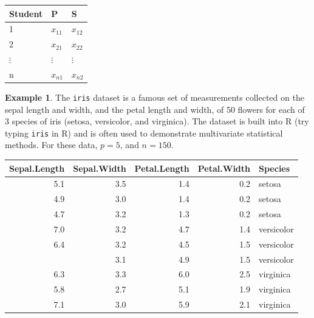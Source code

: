 \documentclass[
]{book}
\theoremstyle{definition}
\theoremstyle{definition}
\newtheorem{example}{Example}[chapter]
\theoremstyle{definition}
\theoremstyle{definition}
\theoremstyle{remark}
\begin{document}
\begin{table}
\centering
\begin{tabular}{lll}
\toprule
Student & P & S\\
\midrule
1 & $x_{11}$ & $x_{12}$\\
2 & $x_{21}$ & $x_{22}$\\
$\vdots$ & $\vdots$ & $\vdots$\\
n & $x_{n1}$ & $x_{n2}$\\
\bottomrule
\end{tabular}
\end{table}

\begin{example}
\protect\hypertarget{exm:iris}{}\label{exm:iris}The \texttt{iris} dataset is a famous set of measurements collected on the sepal length and width, and the petal length and width, of 50 flowers for each of 3 species of iris (setosa, versicolor, and virginica). The dataset is built into R (try typing \texttt{iris} in R) and is often used to demonstrate multivariate statistical methods. For these data, \(p=5\), and \(n=150\).
\end{example}

\begin{table}
\centering
\begin{tabular}{rrrrl}
\toprule
Sepal.Length & Sepal.Width & Petal.Length & Petal.Width & Species\\
\midrule
5.1 & 3.5 & 1.4 & 0.2 & setosa\\
4.9 & 3.0 & 1.4 & 0.2 & setosa\\
4.7 & 3.2 & 1.3 & 0.2 & setosa\\
7.0 & 3.2 & 4.7 & 1.4 & versicolor\\
6.4 & 3.2 & 4.5 & 1.5 & versicolor\\
\addlinespace
6.9 & 3.1 & 4.9 & 1.5 & versicolor\\
6.3 & 3.3 & 6.0 & 2.5 & virginica\\
5.8 & 2.7 & 5.1 & 1.9 & virginica\\
7.1 & 3.0 & 5.9 & 2.1 & virginica\\
\bottomrule
\end{tabular}
\end{table}
\end{document}
